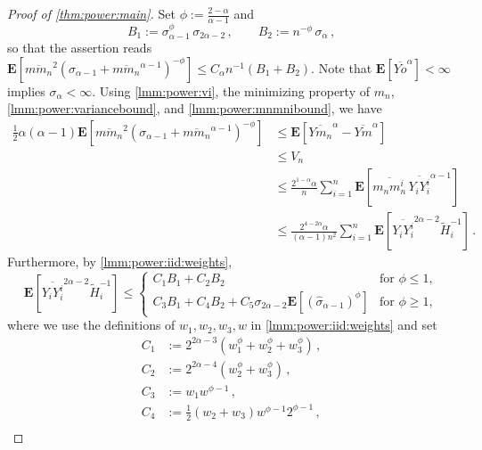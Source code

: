 \documentclass{article}
\newcommand{\lab}{\left[} %
\newcommand{\rab}{\right]} %
\newcommand{\ab}[1]{\lab #1 \rab} %
\newcommand{\abOf}[1]{\!\ab{#1}} %
\newcommand{\lb}{\left(} %
\newcommand{\rb}{\right)} %
\newcommand{\br}[1]{\lb #1 \rb} %
\newcommand{\E}{\mathbf{E}} %
\newcommand{\Eof}[1]{\E[#1]}
\newcommand{\EOf}[1]{\E\abOf{#1}}
\newcommand{\eqcm}{\,,} %
\newcommand{\eqfs}{\,.}
\newcommand{\ol}[2]{\overline{#1#2}}
\begin{document}
\begin{proof}[Proof of \cref{thm:power:main}]
    Set $\phi := \frac{2-\alpha}{\alpha-1}$ and
    \begin{equation}
        B_1 := \sigma_{\alpha-1}^{\phi}\, \sigma_{2\alpha-2}
        \eqcm\qquad
        B_2 := n^{-\phi}\, \sigma_\alpha
        \eqcm
    \end{equation}
    so that the assertion reads $\EOf{\ol{m}{m_n}^2 (\sigma_{\alpha-1} + \ol{m}{m_n}^{\alpha-1})^{-\phi}} \leq C_\alpha n^{-1}\br{B_1+B_2}$.
    Note that $\Eof{\ol Yo^\alpha}<\infty$ implies $\sigma_\alpha<\infty$.
    Using \cref{lmm:power:vi}, the minimizing property of $m_n$, \cref{lmm:power:variancebound}, and \cref{lmm:power:mnmnibound}, we have
    \begin{align}
        \frac12 \alpha (\alpha-1) \EOf{\ol{m}{m_n}^2 \br{\sigma_{\alpha-1} + \ol{m}{m_n}^{\alpha-1}}^{-\phi}}
        &\leq
        \EOf{\ol Y{m_n}^\alpha - \ol Y{m}^\alpha}
        \\&\leq 
        V_n
        \\&\leq 
        \frac{2^{1-\alpha} \alpha}n \sum_{i=1}^n \EOf{\ol {m_n}{m_n^i}\, \ol {Y_i}{Y_i^i}^{\alpha-1}}
        \\&\leq 
        \frac{2^{4-2\alpha} \alpha}{(\alpha-1)n^2} \sum_{i=1}^n \EOf{\ol {Y_i}{Y_i^i}^{2\alpha-2}  \tilde H_i^{-1}}
        \eqfs
    \end{align}
    Furthermore, by \cref{lmm:power:iid:weights},
    \begin{equation}
        \EOf{\ol {Y_i}{Y_i^i}^{2\alpha-2}  \tilde H_i^{-1}} \leq \begin{cases}
            C_1 B_1
            +
            C_2 B_2 
            & \text{for }
            \phi \leq 1,
            \\
            C_3 B_1
            +
            C_4 B_2
            +
            C_5 \sigma_{2\alpha-2} \EOf{(\hat\sigma_{\alpha-1})^{\phi}}
            & \text{for }
            \phi \geq 1,
        \end{cases}
    \end{equation}
    where we use the definitions of $w_1,w_2,w_3,w$ in \cref{lmm:power:iid:weights} and set
    \begin{align}
        C_1 &:= 2^{2\alpha-3} \br{w_1^{\phi}+w_2^{\phi}+w_3^{\phi}}\eqcm\\ 
        C_2 &:= 2^{2\alpha-4} \br{w_2^{\phi}+w_3^{\phi}}\eqcm\\
        C_3 &:= w_1 w^{\phi-1}\eqcm\\
        C_4 &:= \frac12 (w_2+w_3) w^{\phi-1} 2^{\phi-1}\eqcm\\

\end{align}
\end{proof}
\end{document}
